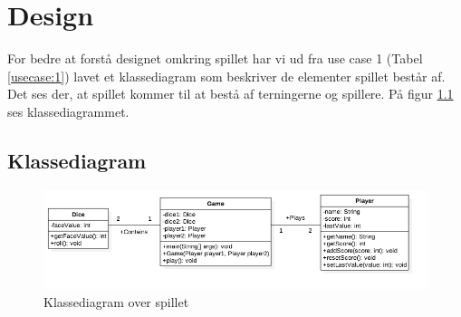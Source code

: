 \chapter{Design}

For bedre at forstå designet omkring spillet har vi ud fra use case 1 (Tabel \ref{usecase:1}) lavet et klassediagram som beskriver de elementer spillet består af. Det ses der, at spillet kommer til at bestå af terningerne og spillere. På figur \ref{fig:klassediagram} ses klassediagrammet. 

\section{Klassediagram}

\begin{figure}[h]
    \begin{center}
        \includegraphics[width=15cm]{graphics/Klassediagram}
        \caption{Klassediagram over spillet}
        \label{fig:klassediagram}
    \end{center}
\end{figure}